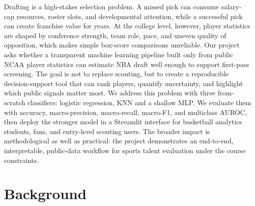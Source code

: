 Drafting is a high-stakes selection problem. A missed pick can consume salary-cap resources, roster slots, and developmental attention, while a successful pick can create franchise value for years. At the college level, however, player statistics are shaped by conference strength, team role, pace, and uneven quality of opposition, which makes simple box-score comparisons unreliable.
Our project asks whether a transparent machine learning pipeline built only from public NCAA player statistics can estimate NBA draft well enough to support first-pass screening. The goal is not to replace scouting, but to create a reproducible decision-support tool that can rank players, quantify uncertainty, and highlight which public signals matter most.
We address this problem with three from-scratch classifiers: logistic regression, KNN and a shallow MLP. We evaluate them with accuracy, macro-precision, macro-recall, macro-F1, and multiclass AUROC, then deploy the stronger model in a Streamlit interface for basketball analytics students, fans, and entry-level scouting users. The broader impact is methodological as well as practical: the project demonstrates an end-to-end, interpretable, public-data workflow for sports talent evaluation under the course constraints.


\section{Background}

